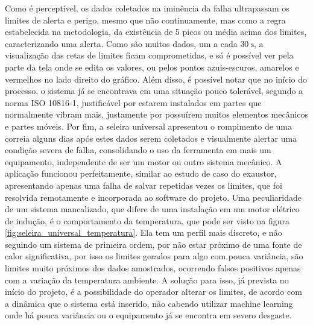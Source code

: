 Como é perceptível, os dados coletados na iminência da falha ultrapassam os limites de alerta e perigo, mesmo que não continuamente, mas
como a regra estabelecida na metodologia, da existência de 5 picos ou média acima dos limites, caracterizando uma alerta. Como são muitos dados,
um a cada $\SI{30}{\second}$, a visualização das retas de limites ficam comprometidas, e só é possível ver pela parte da tela onde se edita os
valores, ou pelos pontos azuis-escuros, amarelos e vermelhos no lado direito do gráfico. Além disso, é possível notar que no início do processo,
o sistema já se encontrava em uma situação pouco tolerável, segundo a norma ISO 10816-1, justificável por estarem instalados em partes que 
normalmente vibram mais, justamente por possuírem muitos elementos mecânicos e partes móveis. Por fim, a seleira universal apresentou o rompimento de uma
correia alguns dias após estes dados serem coletados e visualmente alertar uma condição severa de falha, consolidando o uso da ferramenta em
mais um equipamento, independente de ser um motor ou outro sistema mecânico. A aplicação funcionou perfeitamente, similar ao estudo de caso do
exaustor, apresentando apenas uma falha de salvar repetidas vezes os limites, que foi resolvida remotamente e incorporada ao software do projeto.
Uma peculiaridade de um sistema mancalizado, que difere de uma instalação em um motor elétrico de indução, é o comportamento da temperatura,
que pode ser visto na figura \ref{fig:seleira_universal_temperatura}. 
Ela tem um perfil mais discreto, e não seguindo um sistema de primeira ordem, por não estar próximo de uma fonte de calor significativa, por isso
os limites gerados para algo com pouca variância, são limites muito próximos dos dados amostrados, ocorrendo falsos positivos apenas com a
variação da temperatura ambiente. A solução para isso, já prevista no início do projeto, é a possibilidade do operador alterar os limites, de 
acordo com a dinâmica que o sistema está inserido, não cabendo utilizar  machine learning onde há pouca variância ou o equipamento já se 
encontra em severo desgaste. 

